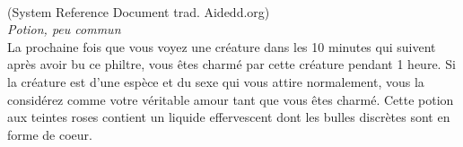 \\
{\small (System Reference Document trad. Aidedd.org)}\\
{\small \it Potion, peu commun}\\
La prochaine fois que vous voyez une créature dans les 10 minutes qui suivent après avoir bu ce philtre, vous êtes charmé par cette créature pendant 1 heure. Si la créature est d'une espèce et du sexe qui vous attire normalement, vous la considérez comme votre véritable amour tant que vous êtes charmé. Cette potion aux teintes roses contient un liquide effervescent dont les bulles discrètes sont en forme de coeur. \\

